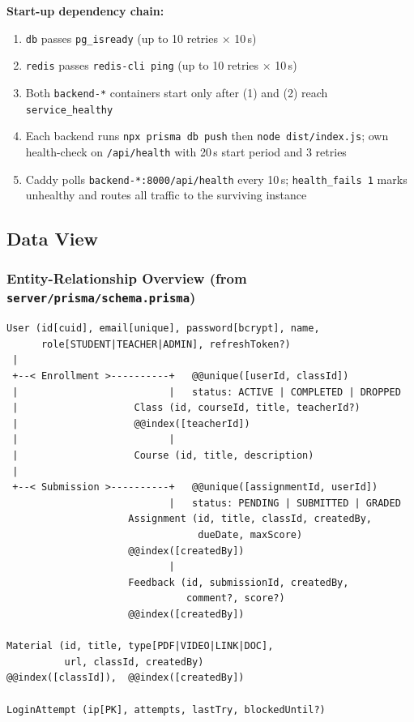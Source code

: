 \documentclass[12pt,a4paper]{article}
\begin{document}
\textbf{Start-up dependency chain:}
\begin{enumerate}[noitemsep]
  \item \texttt{db} passes \texttt{pg\_isready} (up to 10 retries × 10\,s)
  \item \texttt{redis} passes \texttt{redis-cli ping} (up to 10 retries × 10\,s)
  \item Both \texttt{backend-*} containers start only after (1) and (2) reach \texttt{service\_healthy}
  \item Each backend runs \texttt{npx prisma db push} then \texttt{node dist/index.js}; own health-check on \texttt{/api/health} with 20\,s start period and 3 retries
  \item Caddy polls \texttt{backend-*:8000/api/health} every 10\,s; \texttt{health\_fails~1} marks unhealthy and routes all traffic to the surviving instance
\end{enumerate}

\subsection{Data View}
\label{sec:data}

\subsubsection{Entity-Relationship Overview (from \texttt{server/prisma/schema.prisma})}

\begin{lstlisting}[caption={Data model -- schema.prisma}]
User (id[cuid], email[unique], password[bcrypt], name,
      role[STUDENT|TEACHER|ADMIN], refreshToken?)
 |
 +--< Enrollment >----------+   @@unique([userId, classId])
 |                          |   status: ACTIVE | COMPLETED | DROPPED
 |                    Class (id, courseId, title, teacherId?)
 |                    @@index([teacherId])
 |                          |
 |                    Course (id, title, description)
 |
 +--< Submission >----------+   @@unique([assignmentId, userId])
                            |   status: PENDING | SUBMITTED | GRADED
                     Assignment (id, title, classId, createdBy,
                                 dueDate, maxScore)
                     @@index([createdBy])
                            |
                     Feedback (id, submissionId, createdBy,
                               comment?, score?)
                     @@index([createdBy])

Material (id, title, type[PDF|VIDEO|LINK|DOC],
          url, classId, createdBy)
@@index([classId]),  @@index([createdBy])

LoginAttempt (ip[PK], attempts, lastTry, blockedUntil?)
\end{lstlisting}
\end{document}
